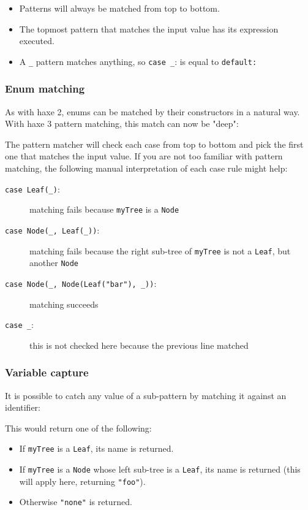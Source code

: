 \documentclass{article}
\newcommand{\expr}[1]{\texttt{#1}}
\begin{document}
\begin{itemize}
	\item Patterns will always be matched from top to bottom.
	\item The topmost pattern that matches the input value has its expression executed.
	\item A \expr{_} pattern matches anything, so \expr{case _}: is equal to \expr{default:}
\end{itemize}

\subsubsection{Enum matching}

As with haxe 2, enums can be matched by their constructors in a natural way. With haxe 3 pattern matching, this match can now be "deep":



The pattern matcher will check each case from top to bottom and pick the first one that matches the input value. If you are not too familiar with pattern matching, the following manual interpretation of each case rule might help:

\begin{description}
	\item[\expr{case Leaf(_)}:] matching fails because \expr{myTree} is a \expr{Node}
	\item[\expr{case Node(_, Leaf(_))}:] matching fails because the right sub-tree of \expr{myTree} is not a \expr{Leaf}, but another \expr{Node}
	\item[\expr{case Node(_, Node(Leaf("bar"), _))}:] matching succeeds
	\item[\expr{case _}:] this is not checked here because the previous line matched
\end{description}

\subsubsection{Variable capture}

It is possible to catch any value of a sub-pattern by matching it against an identifier:



This would return one of the following:

\begin{itemize}
	\item If \expr{myTree} is a \expr{Leaf}, its name is returned.
	\item If \expr{myTree} is a \expr{Node} whose left sub-tree is a \expr{Leaf}, its name is returned (this will apply here, returning \expr{"foo"}).
	\item Otherwise \expr{"none"} is returned.
\end{itemize}
\end{document}

